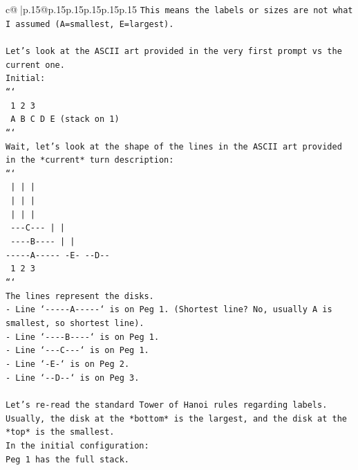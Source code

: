 \documentclass{article}
\begin{document}
{\begin{supertabular}{c@{$\;$}|p{.15\linewidth}@{}p{.15\linewidth}p{.15\linewidth}p{.15\linewidth}p{.15\linewidth}p{.15\linewidth}}
{{{\texttt{This means the labels or sizes are not what I assumed (A=smallest, E=largest).} \\
\\ 
\texttt{Let's look at the ASCII art provided in the very first prompt vs the current one.} \\
\texttt{Initial:} \\
\texttt{```} \\
\texttt{   1 2 3} \\
\texttt{  A B C D E (stack on 1)} \\
\texttt{```} \\
\texttt{Wait, let's look at the shape of the lines in the ASCII art provided in the *current* turn description:} \\
\texttt{```} \\
\texttt{     |           |           |     } \\
\texttt{     |           |           |     } \\
\texttt{     |           |           |     } \\
\texttt{  {-}{-}{-}C{-}{-}{-}        |           |     } \\
\texttt{ {-}{-}{-}{-}B{-}{-}{-}{-}       |           |     } \\
\texttt{{-}{-}{-}{-}{-}A{-}{-}{-}{-}{-}     {-}E{-}        {-}{-}D{-}{-}   } \\
\texttt{     1           2           3     } \\
\texttt{```} \\
\texttt{The lines represent the disks.} \\
\texttt{{-} Line `{-}{-}{-}{-}{-}A{-}{-}{-}{-}{-}` is on Peg 1. (Shortest line? No, usually A is smallest, so shortest line).} \\
\texttt{{-} Line `{-}{-}{-}{-}B{-}{-}{-}{-}` is on Peg 1.} \\
\texttt{{-} Line `{-}{-}{-}C{-}{-}{-}` is on Peg 1.} \\
\texttt{{-} Line `{-}E{-}` is on Peg 2.} \\
\texttt{{-} Line `{-}{-}D{-}{-}` is on Peg 3.} \\
\\ 
\texttt{Let's re{-}read the standard Tower of Hanoi rules regarding labels. Usually, the disk at the *bottom* is the largest, and the disk at the *top* is the smallest.} \\
\texttt{In the initial configuration:} \\
\texttt{Peg 1 has the full stack.} \\
}}}
\end{supertabular}}
\end{document}
